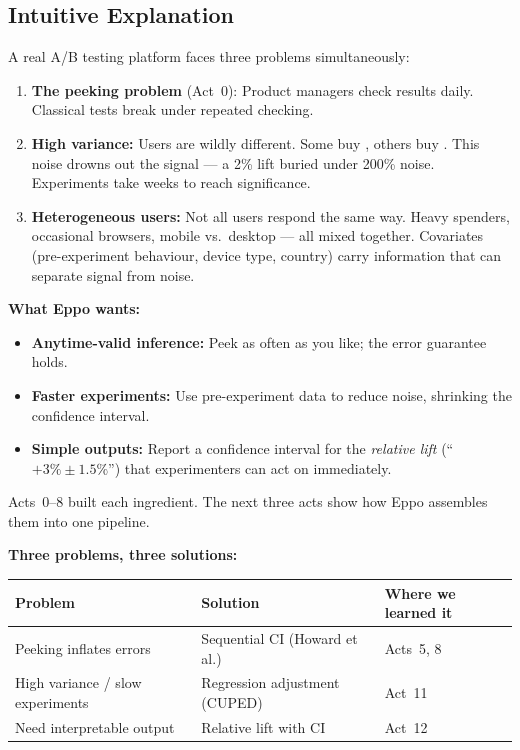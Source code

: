 \documentclass[12pt, a4paper]{article}
\begin{document}
\subsection{Intuitive Explanation}

\begin{intuition}
A real A/B testing platform faces three problems simultaneously:

\begin{enumerate}
  \item \textbf{The peeking problem} (Act~0): Product managers check results
        daily.  Classical tests break under repeated checking.

  \item \textbf{High variance:} Users are wildly different.  Some buy
        , others buy .  This noise drowns out the
        signal --- a 2\% lift buried under 200\% noise.  Experiments take
        weeks to reach significance.

  \item \textbf{Heterogeneous users:} Not all users respond the same way.
        Heavy spenders, occasional browsers, mobile vs.\ desktop --- all
        mixed together.  Covariates (pre-experiment behaviour, device type,
        country) carry information that can separate signal from noise.
\end{enumerate}

\textbf{What Eppo wants:}
\begin{itemize}[nosep]
  \item \textbf{Anytime-valid inference:} Peek as often as you like;
        the error guarantee holds.
  \item \textbf{Faster experiments:} Use pre-experiment data to reduce noise,
        shrinking the confidence interval.
  \item \textbf{Simple outputs:} Report a confidence interval for the
        \emph{relative lift} (``$+3\% \pm 1.5\%$'') that experimenters can
        act on immediately.
\end{itemize}

Acts~0--8 built each ingredient.  The next three acts show how Eppo assembles
them into one pipeline.
\end{intuition}

\begin{keytakeaway}
\textbf{Three problems, three solutions:}
\begin{center}
\renewcommand{\arraystretch}{1.3}
\begin{tabular}{@{} l l l @{}}
\toprule
\textbf{Problem} & \textbf{Solution} & \textbf{Where we learned it} \\
\midrule
Peeking inflates errors & Sequential CI (Howard et al.) & Acts~5, 8 \\
High variance / slow experiments & Regression adjustment (CUPED) & Act~11 \\
Need interpretable output & Relative lift with CI & Act~12 \\
\bottomrule
\end{tabular}
\end{center}
\end{keytakeaway}
\end{document}
